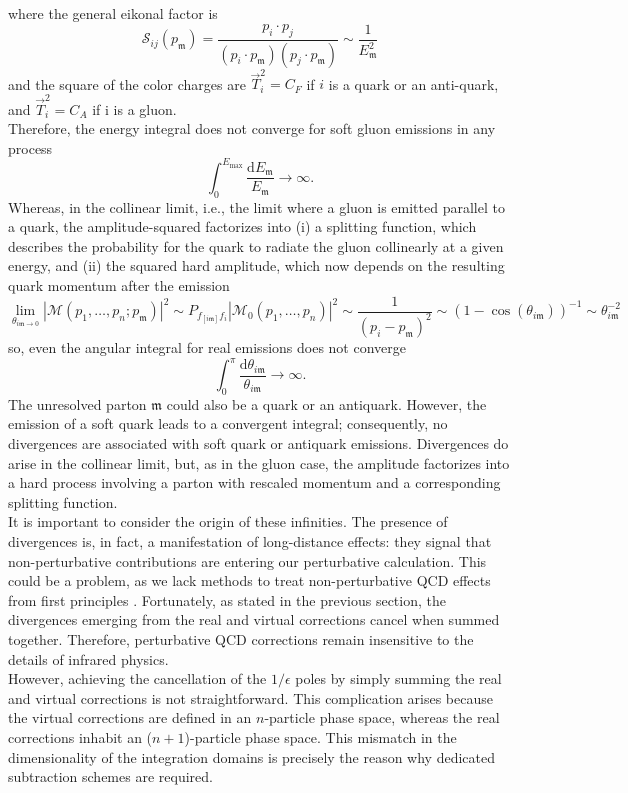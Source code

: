 \documentclass[a4paper, 12pt]{book}
\newcommand{\um}{\mathfrak{m}}
\begin{document}
where the general eikonal factor is
\begin{equation}
    \mathcal{S}_{ij}(p_\um) = \frac{p_i \cdot p_j}{(p_i \cdot p_\um)(p_j \cdot p_\um)} \sim \frac{1}{E_\um^2}
\end{equation}
and the square of the color charges are $\vec{T}_i^2= C_F$ if $i$ is a quark or an anti-quark, and $\vec{T}_i^2= C_A$ if i is a gluon. \\
Therefore, the energy integral does not converge for soft gluon emissions in any process
\begin{equation}
    \int_0^{E_{\mathrm{max}}} \frac{\mathrm{d}E_\um}{E_\um} \rightarrow \infty.
\end{equation}
Whereas, in the collinear limit, i.e., the limit where a gluon is emitted parallel to a quark, the amplitude-squared factorizes into (i) a splitting function, which describes the probability for the quark to radiate the gluon collinearly at a given energy, and (ii) the squared hard amplitude, which now depends on the resulting quark momentum after the emission
\begin{equation}
    \lim_{\theta_{i \um \rightarrow 0}}|\mathcal{M}(p_1, \dots, p_n; p_\um)|^2 \sim P_{f_{[i\um]}f_i} |\mathcal{M}_0(p_1, \dots, p_n)|^2 \sim \frac{1}{(p_i-p_\um)^2} \sim (1-\cos(\theta_{i\um}))^{-1}\sim \theta_{i\um}^{-2}
\end{equation}
so, even the angular integral for real emissions does not converge
\begin{equation}
    \int_0^{\pi} \frac{\mathrm{d}\theta_{i\um}}{{\theta_{i\um}}} \rightarrow \infty.
\end{equation}
The unresolved parton $\um$ could also be a quark or an antiquark. However, the emission of a soft quark leads to a convergent integral; consequently, no divergences are associated with soft quark or antiquark emissions. Divergences do arise in the collinear limit, but, as in the gluon case, the amplitude factorizes into a hard process involving a parton with rescaled momentum and a corresponding splitting function. \\
It is important to consider the origin of these infinities. The presence of divergences is, in fact, a manifestation of long-distance effects: they signal that non-perturbative contributions are entering our perturbative calculation. This could be a problem, as we lack methods to treat non-perturbative QCD effects from first principles \cite{Melnikov2018}. Fortunately, as stated in the previous section, the divergences emerging from the real and virtual corrections cancel when summed together. Therefore, perturbative QCD corrections remain insensitive to the details of infrared physics. \\
However, achieving the cancellation of the $1/\epsilon$ poles by simply summing the real and virtual corrections is not straightforward. This complication arises because the virtual corrections are defined in an $n$-particle phase space, whereas the real corrections inhabit an ($n+1$)-particle phase space. This mismatch in the dimensionality of the integration domains is precisely the reason why dedicated subtraction schemes are required.
\end{document}
